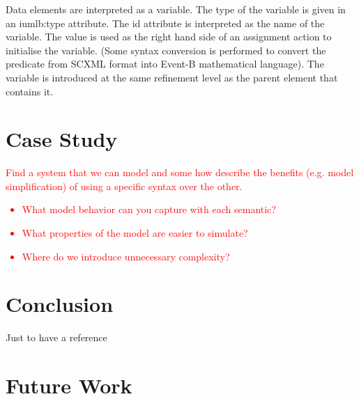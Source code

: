 \documentclass{easychair}
\begin{document}
Data elements are interpreted as a variable. The type of 
the variable is given in an iumlb:type attribute. 
The id attribute is interpreted as the name of the 
variable. The value is used as the right hand side of an 
assignment action to initialise the variable.  (Some syntax 
conversion is performed to convert the predicate from SCXML 
format into Event-B mathematical language). The variable is 
introduced at the same refinement level as the parent 
element that contains it.

\section{Case Study}
\label{sect:caseS}

\textcolor{red}{Find a system that we can model and some how describe the benefits 
(e.g. model simplification) of using a specific syntax over the other.
	\begin{itemize}
		\item What model behavior can you capture with each semantic?
		\item What properties of the model are easier to simulate?
		\item Where do we introduce unnecessary complexity?
	\end{itemize}	
}

\section{Conclusion}
\label{sect:concl}

Just to have a reference ~\cite{texniccenter}

\section{Future Work}
\label{sect:future-work}


\end{document}
